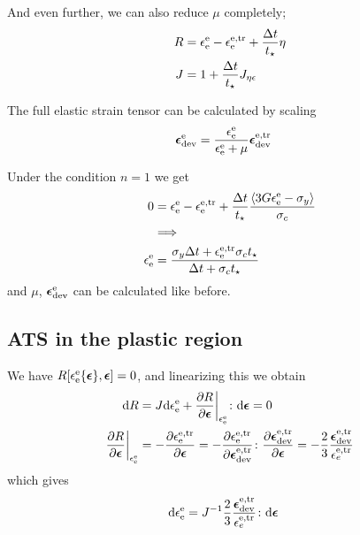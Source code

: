 \documentclass[a4paper,11pt]{article}
\newcommand{\ts}[1]{\text{\boldmath $#1$}}
\newcommand{\pderiv}[2]{\frac{\partial #1}{\partial #2}}
\newcommand{\dev}{{\rm dev}}
\newcommand{\rmd}{{\rm d}}
\newcommand{\rme}{{\rm e}}
\begin{document}
And even further, we can also reduce $\mu$ completely;
\begin{align}
	R &= \epsilon_\rme^\rme -\epsilon^{\rm e,tr}_\rme + \frac{\Delta t}{t_\star}\eta\\
	J &= 1 + \frac{\Delta t}{t_\star}J_{\eta\epsilon}
\end{align}

The full elastic strain tensor can be calculated by scaling 
\begin{align}
	\ts\epsilon_\dev^\rme &= \frac{\epsilon_\rme^\rme}{\epsilon_\rme^\rme+\mu} \ts\epsilon^{\rm e,tr}_\dev
\end{align}

Under the condition $n=1$ we get 
\begin{align}
	0 &= \epsilon_\rme^\rme - \epsilon_\rme^{\rm e,tr} + \frac{\Delta t}{t_\star} \frac{\langle 3 G \epsilon_\rme^\rme - \sigma_y \rangle}{\sigma_c}\\
\nonumber &\Longrightarrow\\
	\epsilon_\rme^\rme &= \frac{\sigma_y\Delta t + \epsilon_\rme^{\rm e,tr}\sigma_c t_\star}{\Delta t + \sigma_c t_\star}
\end{align}
and $\mu$, $\ts\epsilon_\dev^\rme$ can be calculated like before.

\subsection{ATS in the plastic region}
We have $R[\epsilon_\rme^\rme\{\ts\epsilon\},\ts\epsilon] = 0$, and linearizing this we obtain
\begin{align}
	\rmd R &= J \rmd\epsilon_\rme^\rme + \pderiv{R}{\ts\epsilon}\bigg|_{\epsilon_\rme^\rme}\colon\rmd\ts\epsilon = 0\\	
	\pderiv{R}{\ts\epsilon}\bigg|_{\epsilon_\rme^\rme} &= -\pderiv{\epsilon_\rme^{\rme,\rm tr}}{\ts\epsilon} = 
		-\pderiv{\epsilon_\rme^{\rme,\rm tr}}{\ts\epsilon_\dev^{\rme,\rm tr}}\colon\pderiv{\ts\epsilon_\dev^{\rme,\rm tr}}{\ts\epsilon} = 
		-\frac23\frac{\ts\epsilon_\dev^{\rme,\rm tr}}{\epsilon_e^{\rme,\rm tr}}
\end{align}
which gives
\begin{align}
	\rmd\epsilon_\rme^\rme &= 
		J^{-1}\frac23\frac{\ts\epsilon_\dev^{\rme,\rm tr}}{\epsilon_e^{\rme,\rm tr}}\colon\rmd\ts\epsilon
\end{align}
\end{document}
